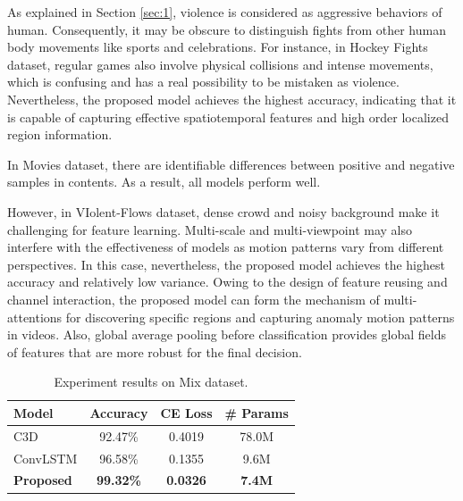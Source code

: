 \documentclass[10pt,twocolumn,letterpaper]{article}
\begin{document}
As explained in Section \ref{sec:1}, violence is considered as aggressive behaviors of human. 
Consequently, it may be obscure to distinguish fights from other human body movements like sports and celebrations.
For instance, in Hockey Fights dataset, regular games also involve physical collisions and intense movements, which is confusing and has a real possibility to be mistaken as violence.
Nevertheless, the proposed model achieves the highest accuracy, indicating that it is capable of capturing effective spatiotemporal features and high order localized region information.

In Movies dataset, there are identifiable differences between positive and negative samples in contents.
As a result, all models perform well.

However, in VIolent-Flows dataset, dense crowd and noisy background make it challenging for feature learning.
Multi-scale and multi-viewpoint may also interfere with the effectiveness of models as motion patterns vary from different perspectives.
In this case, nevertheless, the proposed model achieves the highest accuracy and relatively low variance.
Owing to the design of feature reusing and channel interaction, the proposed model can form the mechanism of multi-attentions for discovering specific regions and capturing anomaly motion patterns in videos.
Also, global average pooling before classification provides global fields of features that are more robust for the final decision.


\begin{table}[t]
\begin{center}
\caption{Experiment results on Mix dataset.}
\label{table:mix}
\begin{tabular}{lccc}
\hline
\textbf{Model} & \textbf{Accuracy} & \textbf{CE Loss} & \textbf{\# Params} \\
\hline\hline
C3D \cite{3dcnn_1} & 92.47\% & 0.4019 & 78.0M \\
ConvLSTM \cite{convlstm_sudh} & 96.58\% & 0.1355 & 9.6M \\
\textbf{Proposed} & \textbf{99.32\%} & \textbf{0.0326} & \textbf{7.4M} \\
\hline
\end{tabular}
\end{center}
\end{table}
\end{document}
